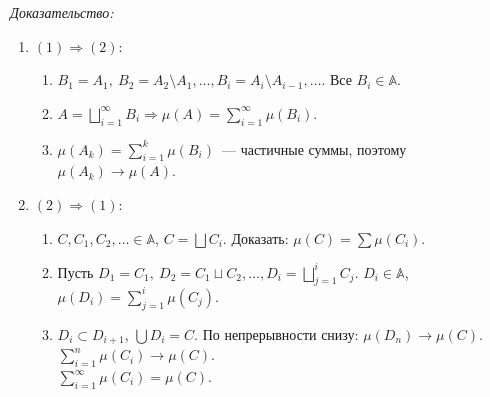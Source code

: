 \documentclass[paper=a4, fontsize=11pt]{article}
\begin{document}
\emph{Доказательство:}
\begin{enumerate}
    \item $(1) \Rightarrow (2)$:
    \begin{enumerate}
        \item $B_1 = A_1,\ B_2 = A_2 \setminus A_1,\dots,B_i = A_i \setminus A_{i-1},\dots$. Все $B_i \in \mathds{A}$.
        \item $A = \bigsqcup_{i=1}^{\infty} B_i \Rightarrow \mu(A) = \sum_{i=1}^{\infty} \mu(B_i)$.
        \item $\mu(A_k) = \sum_{i=1}^{k} \mu(B_i)$~--- частичные суммы, поэтому $\mu(A_k) \to \mu(A)$.
    \end{enumerate}
    \item $(2) \Rightarrow (1)$:
    \begin{enumerate}
        \item $C,C_1,C_2,\dots \in \mathds{A}$, $C = \bigsqcup C_i$. Доказать: $\mu(C) = \sum \mu(C_i)$.
        \item Пусть $D_1 = C_1,\ D_2 = C_1 \sqcup C_2, \dots, D_i = \bigsqcup_{j=1}^i C_j$. $D_i \in \mathds{A}$,
        $\mu(D_i) = \sum_{j=1}^i \mu(C_j)$.
        \item $D_i \subset D_{i+1}$, $\bigcup D_i = C$. По непрерывности снизу: $\mu(D_n) \to \mu(C)$.\\
        $\sum_{i=1}^n \mu(C_i) \to \mu(C)$.\\
        $\sum_{i=1}^{\infty} \mu(C_i) = \mu(C)$.
    \end{enumerate}
\end{enumerate}
\end{document}
